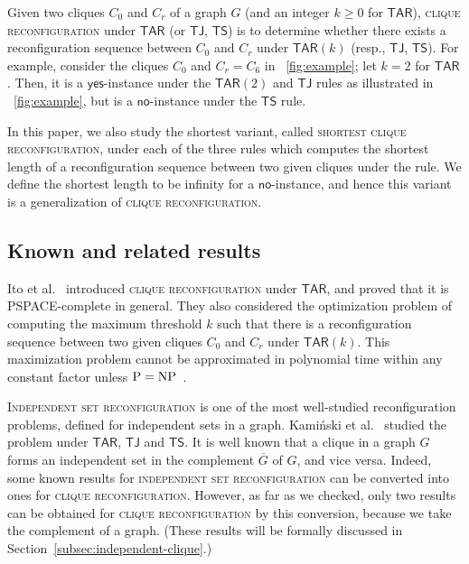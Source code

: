 \documentclass{llncs}
\newcommand{\TAR}[1]{\mathsf{TAR}(#1)}
\newcommand{\TS}{\mathsf{TS}}
\newcommand{\TJ}{\mathsf{TJ}}
\newcommand{\ini}{0}
\newcommand{\tar}{r}
\newcommand{\cliq}{C}
\newcommand{\TARrule}{\mathsf{TAR}}
\newcommand{\YES}{\mathsf{yes}}
\newcommand{\NO}{\mathsf{no}}
\newcounter{one}
\newcounter{two}
\newcounter{three}
\begin{document}
	Given two cliques $\cliq_{\ini}$ and $\cliq_{\tar}$ of a graph $G$ (and an integer $k \ge 0$ for $\TARrule$), \textsc{clique reconfiguration} under $\TARrule$ (or $\TJ$, $\TS$) is to determine whether there exists a reconfiguration sequence between $\cliq_{\ini}$ and $\cliq_{\tar}$ under $\TAR{k}$ (resp., $\TJ$, $\TS$). 
	For example, consider the cliques $\cliq_{\ini}$ and $\cliq_{\tar} = \cliq_6$ in \figurename~\ref{fig:example}; let $k = 2$ for $\TARrule$. 
	Then, it is a $\YES$-instance under the $\TAR{2}$ and $\TJ$ rules as illustrated in \figurename~\ref{fig:example}, but is a $\NO$-instance under the $\TS$ rule.

	In this paper, we also study the shortest variant, called \textsc{shortest clique reconfiguration}, under each of the three rules which computes the shortest length of a reconfiguration sequence between two given cliques under the rule.
	We define the shortest length to be infinity for a $\NO$-instance, and hence this variant is a generalization of \textsc{clique reconfiguration}. 

\subsection{Known and related results}
	
	Ito et al.~\cite{IDHPSUU} introduced \textsc{clique reconfiguration} under $\TARrule$, and proved that it is PSPACE-complete in general. 
	They also considered the optimization problem of computing the maximum threshold $k$ such that there is a reconfiguration sequence between two given cliques $\cliq_{\ini}$ and $\cliq_{\tar}$ under $\TAR{k}$. 
	This maximization problem cannot be approximated in polynomial time within any constant factor unless ${\rm P} = {\rm NP}$~\cite{IDHPSUU}.

	\textsc{Independent set reconfiguration} is one of the most well-studied reconfiguration problems, defined for independent sets in a graph. 
	Kami\'nski et al.~\cite{KaminskiMM12} studied the problem under $\TARrule$, $\TJ$ and $\TS$. 
	It is well known that a clique in a graph $G$ forms an independent set in the complement $\overline{G}$ of $G$, and vice versa.
	Indeed, some known results for \textsc{independent set reconfiguration} can be converted into ones for \textsc{clique reconfiguration}.
However, as far as we checked, only two results can be obtained for \textsc{clique reconfiguration} by this conversion, because we take the complement of a graph.
(These results will be formally discussed in Section~\ref{subsec:independent-clique}.)
\end{document}
